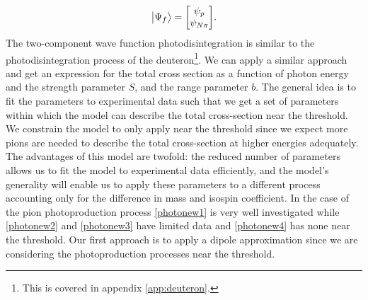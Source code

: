\begin{equation} \label{psif}
	\ket{\Psi_f} = \mqty[\psi_p \\ \psi_{N\pi}].
\end{equation}
The two-component wave function photodisintegration is similar to the photodisintegration process of the deuteron\footnote{This is covered in appendix \ref{app:deuteron}.}. We can apply a similar approach and get an expression for the total cross section as a function of photon energy and the strength parameter $S$, and the range parameter $b$. The general idea is to fit the parameters to experimental data such that we get a set of parameters within which the model can describe the total cross-section near the threshold. We constrain the model to only apply near the threshold since we expect more pions are needed to describe the total cross-section at higher energies adequately.
The advantages of this model are twofold: the reduced number of parameters allows us to fit the model to experimental data efficiently, and the model's generality will enable us to apply these parameters to a different process accounting only for the difference in mass and isospin coefficient. In the case of the pion photoproduction process \eqref{photonew1} is very well investigated \cite{Bergstrom, Mazzucato, Beck, Fuchs, PionOffNeutron} while \eqref{photonew2} and \eqref{photonew3} have limited data \cite{PionOffNeutron} and \eqref{photonew4} has none near the threshold. Our first approach is to apply a dipole approximation since we are considering the photoproduction processes near the threshold. 
